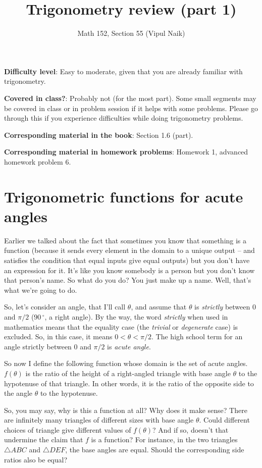 \documentclass{amsart}
\title{Trigonometry review (part 1)}
\author{Math 152, Section 55 (Vipul Naik)}
\begin{document}
\maketitle

{\bf Difficulty level}: Easy to moderate, given that you are already
familiar with trigonometry.

{\bf Covered in class?}: Probably not (for the most part). Some small
segments may be covered in class or in problem session if it helps
with some problems. Please go through this if you experience
difficulties while doing trigonometry problems.

{\bf Corresponding material in the book}: Section 1.6 (part).

{\bf Corresponding material in homework problems}: Homework 1,
advanced homework problem 6.

\section{Trigonometric functions for acute angles}

Earlier we talked about the fact that sometimes you know that
something is a function (because it sends every element in the domain
to a unique output -- and satisfies the condition that equal inputs
give equal outputs) but you don't have an expression for it. It's like
you know somebody is a person but you don't know that person's
name. So what do you do? You just make up a name. Well, that's what
we're going to do.

So, let's consider an angle, that I'll call $\theta$, and assume that
$\theta$ is {\em strictly} between $0$ and $\pi/2$ ($90\,^\circ$, a
right angle). By the way, the word {\em strictly} when used in
mathematics means that the equality case (the {\em trivial} or {\em
degenerate} case) is excluded. So, in this case, it means $0 < \theta
< \pi/2$. The high school term for an angle strictly between $0$ and
$\pi/2$ is {\em acute angle}.

So now I define the following function whose domain is the set of
acute angles. $f(\theta)$ is the ratio of the height of a right-angled
triangle with base angle $\theta$ to the hypotenuse of that
triangle. In other words, it is the ratio of the opposite side to the
angle $\theta$ to the hypotenuse.

So, you may say, why is this a function at all? Why does it make
sense? There are infinitely many triangles of different sizes with
base angle $\theta$. Could different choices of triangle give
different values of $f(\theta)$? And if so, doesn't that undermine the
claim that $f$ is a function? For instance, in the two triangles
$\triangle ABC$ and $\triangle DEF$, the base angles are equal. Should
the corresponding side ratios also be equal?
\end{document}
